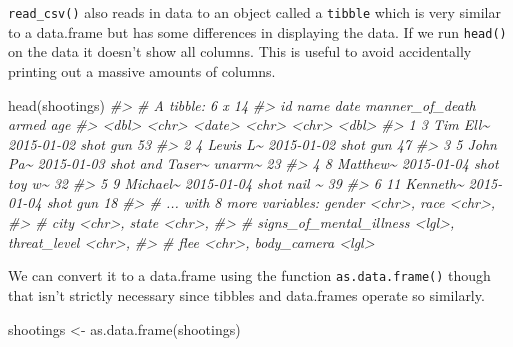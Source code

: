 \documentclass[
]{krantz}
\makeatletter
\newenvironment{Shaded}{\begin{snugshade}}{\end{snugshade}}
\newcommand{\CommentTok}[1]{\textcolor[rgb]{0.37,0.37,0.37}{\textit{#1}}}
\newcommand{\FunctionTok}[1]{\textcolor[rgb]{0,0,0}{#1}}
\newcommand{\NormalTok}[1]{#1}
\newcommand{\OtherTok}[1]{\textcolor[rgb]{0.37,0.37,0.37}{#1}}
\newenvironment{kframe}{%
\medskip{}
\setlength{\fboxsep}{.8em}
 \def\at@end@of@kframe{}%
 \ifinner\ifhmode%
  \def\at@end@of@kframe{\end{minipage}}%
  \begin{minipage}{\columnwidth}%
 \fi\fi%
 \def\FrameCommand##1{\hskip\@totalleftmargin \hskip-\fboxsep
 \colorbox{shadecolor}{##1}\hskip-\fboxsep
     \hskip-\linewidth \hskip-\@totalleftmargin \hskip\columnwidth}%
 \MakeFramed {\advance\hsize-\width
   \@totalleftmargin\z@ \linewidth\hsize
   \@setminipage}}%
 {\par\unskip\endMakeFramed%
 \at@end@of@kframe}
\renewenvironment{Shaded}{\begin{kframe}}{\end{kframe}}
\makeatother
\begin{document}
\texttt{read\_csv()} also reads in data to an object called a \texttt{tibble} which is very similar to a data.frame but has some differences in displaying the data. If we run \texttt{head()} on the data it doesn't show all columns. This is useful to avoid accidentally printing out a massive amounts of columns.

\begin{Shaded}
\begin{Highlighting}[]
\FunctionTok{head}\NormalTok{(shootings)}
\CommentTok{\#\textgreater{} \# A tibble: 6 x 14}
\CommentTok{\#\textgreater{}      id name     date       manner\_of\_death armed    age}
\CommentTok{\#\textgreater{}   \textless{}dbl\textgreater{} \textless{}chr\textgreater{}    \textless{}date\textgreater{}     \textless{}chr\textgreater{}           \textless{}chr\textgreater{}  \textless{}dbl\textgreater{}}
\CommentTok{\#\textgreater{} 1     3 Tim Ell\textasciitilde{} 2015{-}01{-}02 shot            gun       53}
\CommentTok{\#\textgreater{} 2     4 Lewis L\textasciitilde{} 2015{-}01{-}02 shot            gun       47}
\CommentTok{\#\textgreater{} 3     5 John Pa\textasciitilde{} 2015{-}01{-}03 shot and Taser\textasciitilde{} unarm\textasciitilde{}    23}
\CommentTok{\#\textgreater{} 4     8 Matthew\textasciitilde{} 2015{-}01{-}04 shot            toy w\textasciitilde{}    32}
\CommentTok{\#\textgreater{} 5     9 Michael\textasciitilde{} 2015{-}01{-}04 shot            nail \textasciitilde{}    39}
\CommentTok{\#\textgreater{} 6    11 Kenneth\textasciitilde{} 2015{-}01{-}04 shot            gun       18}
\CommentTok{\#\textgreater{} \# ... with 8 more variables: gender \textless{}chr\textgreater{}, race \textless{}chr\textgreater{},}
\CommentTok{\#\textgreater{} \#   city \textless{}chr\textgreater{}, state \textless{}chr\textgreater{},}
\CommentTok{\#\textgreater{} \#   signs\_of\_mental\_illness \textless{}lgl\textgreater{}, threat\_level \textless{}chr\textgreater{},}
\CommentTok{\#\textgreater{} \#   flee \textless{}chr\textgreater{}, body\_camera \textless{}lgl\textgreater{}}
\end{Highlighting}
\end{Shaded}

We can convert it to a data.frame using the function \texttt{as.data.frame()} though that isn't strictly necessary since tibbles and data.frames operate so similarly.

\begin{Shaded}
\begin{Highlighting}[]
\NormalTok{shootings }\OtherTok{\textless{}{-}} \FunctionTok{as.data.frame}\NormalTok{(shootings)}
\end{Highlighting}
\end{Shaded}
\end{document}
